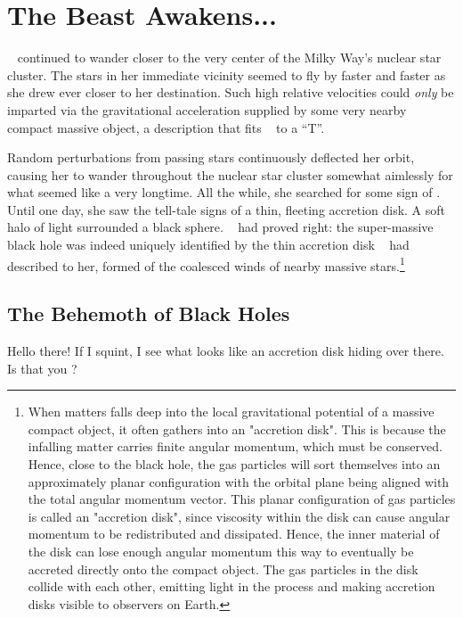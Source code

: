 \documentclass[main.tex]{subfiles}
\begin{document}
\chapter{The Beast Awakens...}

\par \nar \rmelectra~ continued to wander closer to the very center of the Milky Way's nuclear star cluster.  The stars in her immediate vicinity seemed to fly by faster and faster as she drew ever closer to her destination.  Such high relative velocities could \textit{only} be imparted via the gravitational acceleration supplied by some very nearby compact massive object, a description that fits \rmchiron~ to a ``T''.  

\par \nar Random perturbations from passing stars continuously deflected her orbit, causing her to wander throughout the nuclear star cluster somewhat aimlessly for what seemed like a very longtime.  All the while, she searched for some sign of \rmchiron.  Until one day, she saw the tell-tale signs of a thin, fleeting accretion disk.  A soft halo of light surrounded a black sphere.  \rmenrico~ had proved right:  the super-massive black hole was indeed uniquely identified by the thin accretion disk \rmenrico~ had described to her, formed of the coalesced winds of nearby massive stars.\footnote{When matters falls deep into the local gravitational potential of a massive compact object, it often gathers into an "accretion disk".  This is because the infalling matter carries finite angular momentum, which must be conserved.  Hence, close to the black hole, the gas particles will sort themselves into an approximately planar configuration with the orbital plane being aligned with the total angular momentum vector.  This planar configuration of gas particles is called an "accretion disk", since viscosity within the disk can cause angular momentum to be redistributed and dissipated.  Hence, the inner material of the disk can lose enough angular momentum this way to eventually be accreted directly onto the compact object.  The gas particles in the disk collide with each other, emitting light in the process and making accretion disks visible to observers on Earth.}

\section{The Behemoth of Black Holes}

\par \Electra  Hello there!  If I squint, I see what looks like an accretion disk hiding over there.  Is that you \rmchiron?
\end{document}

